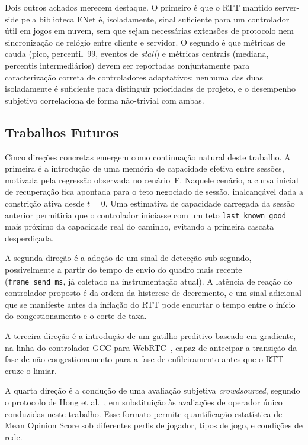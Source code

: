 \documentclass[conference]{IEEEtran}
\begin{document}
Dois outros achados merecem destaque. O primeiro é que o RTT
mantido server-side pela biblioteca ENet é, isoladamente,
sinal suficiente para um controlador útil em jogos em nuvem,
sem que sejam necessárias extensões de protocolo nem
sincronização de relógio entre cliente e servidor. O segundo é
que métricas de cauda (pico, percentil~99, eventos de
\emph{stall}) e métricas centrais (mediana, percentis
intermediários) devem ser reportadas conjuntamente para
caracterização correta de controladores adaptativos: nenhuma
das duas isoladamente é suficiente para distinguir prioridades
de projeto, e o desempenho subjetivo correlaciona de forma
não-trivial com ambas.

\subsection{Trabalhos Futuros}

Cinco direções concretas emergem como continuação natural
deste trabalho. A primeira é a introdução de uma memória de
capacidade efetiva entre sessões, motivada pela regressão
observada no cenário~F. Naquele cenário, a curva inicial de
recuperação fica apontada para o teto negociado de sessão,
inalcançável dada a constrição ativa desde $t=0$. Uma
estimativa de capacidade carregada da sessão anterior
permitiria que o controlador iniciasse com um teto
\texttt{last\_known\_good} mais próximo da capacidade real do
caminho, evitando a primeira cascata desperdiçada.

A segunda direção é a adoção de um sinal de detecção
sub-segundo, possivelmente a partir do tempo de envio do
quadro mais recente (\texttt{frame\_send\_ms}, já coletado na
instrumentação atual). A latência de reação do controlador
proposto é da ordem da histerese de decremento, e um sinal
adicional que se manifeste antes da inflação do RTT pode
encurtar o tempo entre o início do congestionamento e o corte
de taxa.

A terceira direção é a introdução de um gatilho preditivo
baseado em gradiente, na linha do controlador GCC para
WebRTC~\cite{gcc}, capaz de antecipar a transição da fase de
não-congestionamento para a fase de enfileiramento antes que
o RTT cruze o limiar.

A quarta direção é a condução de uma avaliação subjetiva
\emph{crowdsourced}, segundo o protocolo de Hong et
al.~\cite{hong2015}, em substituição às avaliações de
operador único conduzidas neste trabalho. Esse formato
permite quantificação estatística de Mean Opinion Score sob
diferentes perfis de jogador, tipos de jogo, e condições de
rede.
\end{document}
